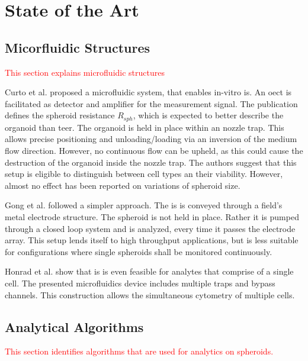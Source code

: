 \chapter{State of the Art}

\section{Micorfluidic Structures}
\textcolor{red}{This section explains microfluidic structures}

Curto et al. \cite{Curto2018} proposed a microfluidic system, that enables in-vitro \gls{is}. An \gls{oect} is facilitated as detector and amplifier for the measurement signal. The publication defines the spheroid resistance $R_{sph}$, which is expected to better describe the organoid than \gls{teer}. The organoid is held in place within an nozzle trap. This allows precise positioning and unloading/loading via an inversion of the medium flow direction. However, no continuous flow can be upheld, as this could cause the destruction of the organoid inside the nozzle trap. The authors suggest that this setup is eligible to distinguish between cell types an their viability. However, almost no effect has been reported on variations of spheroid size. 

Gong et al. \cite{Gong2021} followed a simpler approach. The \gls{is} is conveyed through a field's metal electrode structure. The spheroid is not held in place. Rather it is pumped through a closed loop system and is analyzed, every time it passes the electrode array. This setup lends itself to high throughput applications, but is less suitable for configurations where single spheroids shall be monitored continuously.

Honrad et al. \cite{Honrado2021} show that \gls{is} is even feasible for analytes that comprise of a single cell. The presented microfluidics device includes multiple traps and bypass channels. This construction allows the simultaneous cytometry of multiple cells. 

\section{Analytical Algorithms}
\textcolor{red}{This section identifies algorithms that are used for analytics on spheroids.}
